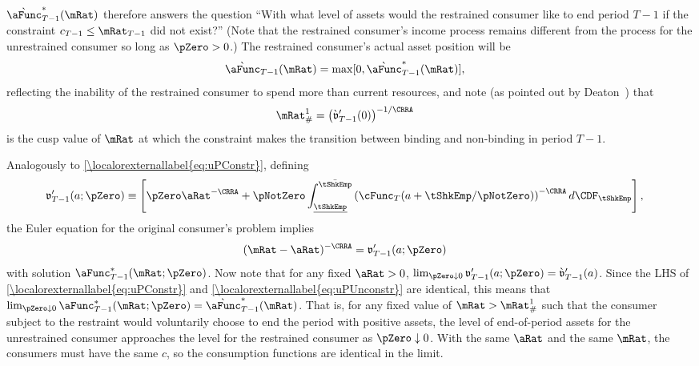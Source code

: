 \documentclass[\econtexRoot/BufferStockTheory.tex]{subfiles}
\begin{document}
$\grave{\aFunc}_{T-1}^{*}(\mRat)$ therefore answers the question ``With what
level of assets would the restrained consumer like to end period $T-1$
if the constraint $c_{T-1} \leq \mRat_{T-1}$ did not exist?''  (Note that
the restrained consumer's income process remains different from the
process for the unrestrained consumer so long as $\pZero>0$.)  The
restrained consumer's actual asset position will be
 \begin{align}
  \grave{\aFunc}_{T-1}(\mRat)  & = \max[0,\grave{\aFunc}^{*}_{T-1}(\mRat)], \notag
\end{align}
reflecting the inability of the restrained consumer to spend more than
current resources, and note (as pointed out by
Deaton~\citeyearpar{deatonLiqConstr}) that
 \begin{align}
  \mRat^{1}_{\#}  & = \left( \grave{\mathfrak{v}}_{T-1}^{\prime}(0)\right)^{-1/\CRRA} \notag
 \end{align}
is the cusp value of $\mRat$ at which the constraint makes the
transition between binding and non-binding in period $T-1$.

Analogously to \eqref{\localorexternallabel{eq:uPConstr}}, defining
\begin{align}
  \mathfrak{v}_{T-1}^{\prime}(a;\pZero)  & \equiv  \left[\pZero \aRat^{-\CRRA}+\pNotZero\int_{\ushort{\tShkEmp}}^{\bar{\tShkEmp}} \left(\cFunc_{T}(a+\tShkEmp/\pNotZero)\right)^{-\CRRA} d\CDF_{\tShkEmp}\right], \label{eq:vFrakPrime}
\end{align}
the Euler equation for the original consumer's problem implies
\begin{align}
 (\mRat-\aRat)^{-\CRRA}  & = \mathfrak{v}_{T-1}^{\prime}(a;\pZero) \label{eq:uPUnconstr}
\end{align}
with solution $\aFunc_{T-1}^{*}(\mRat;\pZero)$.  Now note that for any
fixed $\aRat>0$, $\lim_{\pZero \downarrow 0}
\mathfrak{v}_{T-1}^{\prime}(a;\pZero) =
\grave{\mathfrak{v}}_{T-1}^{\prime}(a)$.  Since the LHS of
\eqref{\localorexternallabel{eq:uPConstr}} and \eqref{\localorexternallabel{eq:uPUnconstr}} are identical, this
means that $\lim_{\pZero \downarrow 0}
\aFunc_{T-1}^{*}(\mRat;\pZero) =
\grave{\aFunc}_{T-1}^{*}(\mRat)$.  That is, for any fixed value of
$\mRat > \mRat^{1}_{\#}$ such that the consumer subject to the
restraint would voluntarily choose to end the period with positive
assets, the level of end-of-period assets for the unrestrained
consumer approaches the level for the restrained consumer as $\pZero
\downarrow 0$.  With the same $\aRat$ and the same $\mRat$, the
consumers must have the same $c$, so the consumption functions are
identical in the limit.
\end{document}
